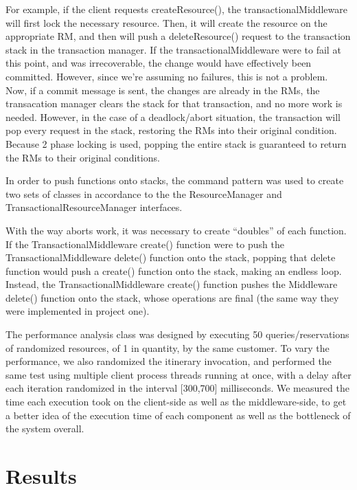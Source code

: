 \documentclass[letterpaper,12pt]{article}
\begin{document}
For example, if the client requests createResource(), the transactionalMiddleware will first lock the necessary resource. Then, it will create the resource on the appropriate RM, and then will push a deleteResource() request to the transaction stack in the transaction manager. If the transactionalMiddleware were to fail at this point, and was irrecoverable, the change would have effectively been committed. However, since we're assuming no failures, this is not a problem. Now, if a commit message is sent, the changes are already in the RMs, the transacation manager clears the stack for that transaction, and no more work is needed. However, in the case of a deadlock/abort situation, the transaction will pop every request in the stack, restoring the RMs into their original condition. Because 2 phase locking is used, popping the entire stack is guaranteed to return the RMs to their original conditions.

In order to push functions onto stacks, the command pattern was used to create two sets of classes in accordance to the the ResourceManager and TransactionalResourceManager interfaces.

With the way aborts work, it was necessary to create ``doubles'' of each function. If the TransactionalMiddleware create() function were to push the TransactionalMiddleware delete() function onto the stack, popping that delete function would push a create() function onto the stack, making an endless loop. Instead, the TransactionalMiddleware create() function pushes the Middleware delete() function onto the stack, whose operations are final (the same way they were implemented in project one).

The performance analysis class was designed by executing 50 queries/reservations of randomized resources, of 1 in quantity, by the same customer. To vary the performance, we also randomized the itinerary invocation, and performed the same test using multiple client process threads running at once, with a delay after each iteration randomized in the interval [300,700] milliseconds. We measured the time each execution took on the client-side as well as the middleware-side, to get a better idea of the execution time of each component as well as the bottleneck of the system overall.



\section{Results}
\end{document}
